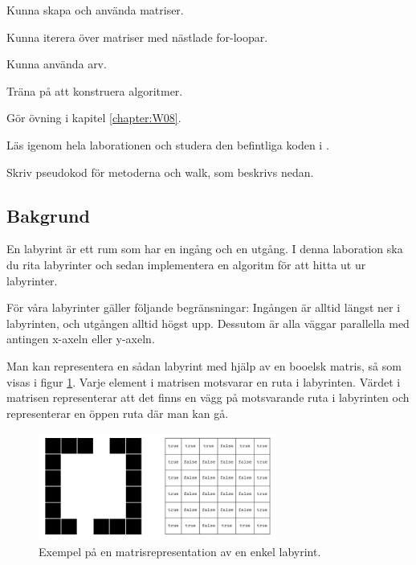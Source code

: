 
\Lab{\LabWeekEIGHT}

\begin{Goals}
\item Kunna skapa och använda matriser.
\item Kunna iterera över matriser med nästlade for-loopar.
\item Kunna använda arv.
\item Träna på att konstruera algoritmer.
\end{Goals}

\begin{Preparations}
\item Gör övning {\tt \ExeWeekEIGHT} i kapitel \ref{chapter:W08}.

\item Läs igenom hela laborationen och studera den befintliga koden i .

\item Skriv pseudokod för metoderna  och {walk}, som beskrivs nedan.
\end{Preparations}

\subsection{Bakgrund}

En labyrint är ett rum som har en ingång och en utgång.  I denna laboration ska du rita labyrinter och sedan implementera en algoritm för att hitta ut ur labyrinter.

För våra labyrinter gäller följande begränsningar: Ingången är alltid längst ner i labyrinten, och utgången alltid högst upp. Dessutom är alla väggar parallella med antingen x-axeln eller y-axeln.

Man kan representera en sådan labyrint med hjälp av en booelsk matris, så som visas i figur \ref{maze:figboolmatrix}. Varje element i matrisen motsvarar en ruta i labyrinten. Värdet  i matrisen representerar att det finns en vägg på motsvarande ruta i labyrinten och  representerar en öppen ruta där man kan gå.

\begin{figure}[h]
	\begin{center}
		\includegraphics[width=0.7\textwidth]{../img/w09-lab/MazeAndMatrix.jpg}
	\end{center}
	\caption{Exempel på en matrisrepresentation av en enkel labyrint.}
	\label{maze:figboolmatrix}
\end{figure}


